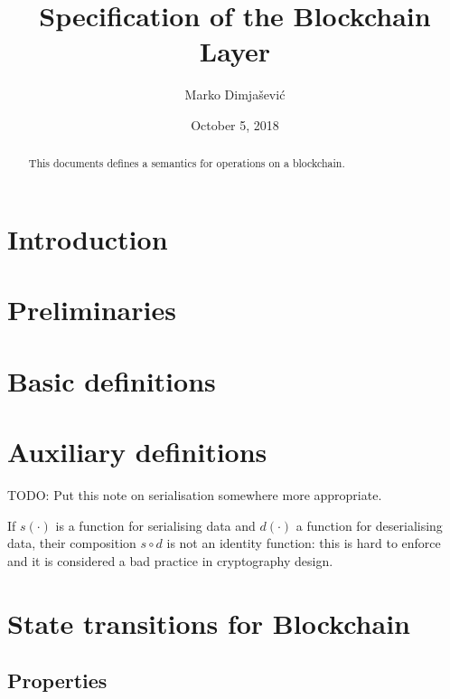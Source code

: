 \documentclass[11pt,a4paper]{article}
\begin{document}
\title{Specification of the Blockchain Layer}

\author{Marko Dimjašević}

\date{October 5, 2018}

\maketitle

\begin{abstract}
This documents defines a semantics for operations on a blockchain.
\end{abstract}

\tableofcontents
\listoffigures

\section{Introduction}
\label{sec:introduction}

\section{Preliminaries}
\label{sec:preliminaries}

\section{Basic definitions}
\label{sec:basic-definitions}

\section{Auxiliary definitions}
\label{sec:auxil-defin}
TODO: Put this note on serialisation somewhere more appropriate.

If $s(\cdot)$ is a function for serialising data and $d(\cdot)$ a function for
deserialising data, their composition $s \circ d$ is not an identity function:
this is hard to enforce and it is considered a bad practice in cryptography
design.

\section{State transitions for Blockchain}
\label{sec:state-trans-chain}

\subsection{Properties}
\label{sec:chain-properties}
\end{document}
